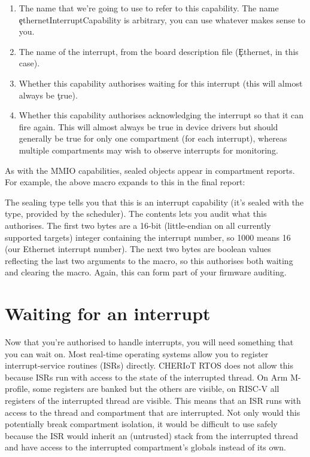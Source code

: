 \begin{enumerate}
	\item{The name that we're going to use to refer to this capability.
		The name \c{ethernetInterruptCapability} is arbitrary, you can use whatever makes sense to you.}
	\item{The name of the interrupt, from the board description file (\c{Ethernet}, in this case).}
	\item{Whether this capability authorises waiting for this interrupt (this will almost always be \c{true}).}
\item{Whether this capability authorises acknowledging the interrupt so that it can fire again.
	This will almost always be true in device drivers but should generally be true for only one compartment (for each interrupt), whereas multiple compartments may wish to observe interrupts for monitoring.}
\end{enumerate}

As with the MMIO capabilities, sealed objects appear in compartment reports.
For example, the above macro expands to this in the final report:

\begin{cxxsnippet}
        {
          "contents": "10000101",
          "kind": "SealedObject",
          "sealing_type": {
            "compartment": "sched",
            "key": "InterruptKey",
            "provided_by": "build/cheriot/cheriot/release/example-firmware.scheduler.compartment",
            "symbol": "__export.sealing_type.sched.InterruptKey"
          \}
\end{cxxsnippet}

The sealing type tells you that this is an interrupt capability (it's sealed with the  type, provided by the scheduler).
The contents lets you audit what this authorises.
The first two bytes are a 16-bit (little-endian on all currently supported targets) integer containing the interrupt number, so 1000 means 16 (our Ethernet interrupt number).
The next two bytes are boolean values reflecting the last two arguments to the macro, so this authorises both waiting and clearing the macro.
Again, this can form part of your firmware auditing.

\section[label=interrupt_waiting]{Waiting for an interrupt}

Now that you're authorised to handle interrupts, you will need something that you can wait on.
Most real-time operating systems allow you to register interrupt-service routines (ISRs) directly.
CHERIoT RTOS does not allow this because ISRs run with access to the state of the interrupted thread.
On Arm M-profile, some registers are banked but the others are visible, on RISC-V all registers of the interrupted thread are visible.
This means that an ISR runs with access to the thread and compartment that are interrupted.
Not only would this potentially break compartment isolation, it would be difficult to use safely because the ISR would inherit an (untrusted) stack from the interrupted thread and have access to the interrupted compartment's globals instead of its own.

